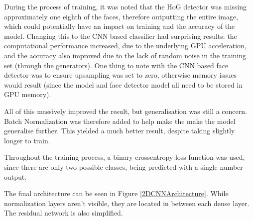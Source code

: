 \documentclass[10pt,a4paper]{article}
\begin{document}
        During the process of training, it was noted that the HoG detector was missing approximately one eighth of the faces, therefore outputting the entire image, which
        could potentially have an impact on training and the accuracy of the model. Changing this to the CNN based classifier had surprising results: the computational performance increased,
        due to the underlying GPU acceleration, and the accuracy also improved due to the lack of random noise in the training set (through the generators). One thing to note with the CNN based
        face detector was to ensure upsampling was set to zero, otherwise memory issues would result (since the model and face detector model all need to be stored in GPU memory).
        
        All of this massively improved the result, but generalisation was still a concern. Batch Normalization was therefore added to help make the make the model generalise further.
        This yielded a much better result, despite taking slightly longer to train. 

        Throughout the training process, a binary crossentropy loss function was used, since there are only two possible classes, being predicted with a single number output. 

        The final architecture can be seen in Figure \ref{2DCNNArchitecture}. While normalization layers aren't visible, they are located in between each dense layer. The residual network
        is also simplified.
\end{document}
